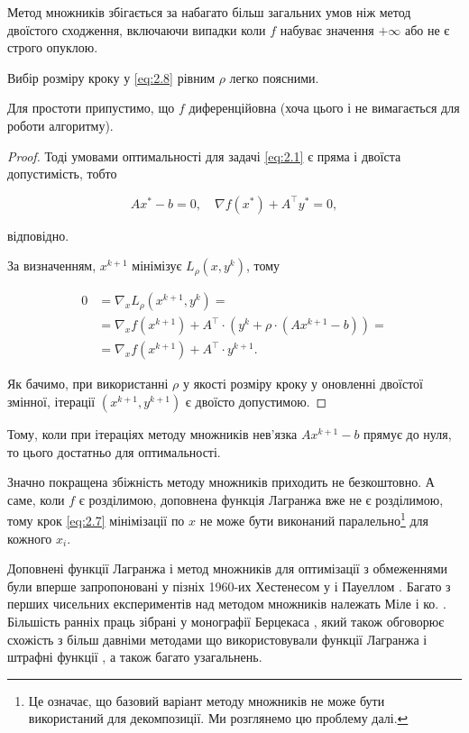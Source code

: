 \begin{remark}
    Метод множників збігається за набагато більш загальних умов ніж метод двоїстого сходження, включаючи випадки коли $f$ набуває значення $+\infty$ або не є строго опуклою.
\end{remark}

\begin{proposition}
    Вибір розміру кроку у \eqref{eq:2.8} рівним $\rho$ легко поясними.
\end{proposition}

\begin{assumption}
    Для простоти припустимо, що $f$ диференційовна (хоча цього і не вимагається для роботи алгоритму). 
\end{assumption}

\begin{proof}
    Тоді умовами оптимальності для задачі \eqref{eq:2.1} є пряма і двоїста допустимість, тобто
    
    \begin{equation}
    	A x^* - b = 0, \quad \nabla f(x^*) + A^\intercal y^* = 0,
    \end{equation}
    
    відповідно. \medskip
    
    За визначенням, $x^{k + 1}$ мінімізує $L_\rho(x, y^k)$, тому
    
    \begin{align}
    	0 &= \nabla_x L_\rho \left(x^{k + 1}, y^k\right) = \\
    	  &= \nabla_x f \left(x^{k + 1}\right) + 
    	  A^\intercal \cdot \left(y^k + \rho \cdot \left(A x^{k + 1} - b\right)\right) = \\
    	  &= \nabla_x f \left(x^{k + 1}\right) + A^\intercal \cdot y^{k + 1}.
    \end{align}
    
    Як бачимо, при використанні $\rho$ у якості розміру кроку у оновленні двоїстої змінної, ітерації $\left( x^{k + 1}, y^{k + 1} \right)$ є двоїсто допустимою.
\end{proof}

Тому, коли при ітераціях методу множників нев'язка $A x^{k + 1} - b$ прямує до нуля, то цього достатньо для оптимальності. \medskip

Значно покращена збіжність методу множників приходить не безкоштовно. А саме, коли $f$ є розділимою, доповнена функція Лагранжа вже не є розділимою, тому крок \eqref{eq:2.7} мінімізації по $x$ не може бути виконаний паралельно\footnote{Це означає, що базовий варіант методу множників не може бути використаний для декомпозиції. Ми розглянемо цю проблему далі.} для кожного $x_i$.  \medskip

Доповнені функції Лагранжа і метод множників для оптимізації з обмеженнями були вперше запропоновані у пізніх 1960-их Хестенесом у \cite{97, 98} і Пауеллом \cite{138}. Багато з перших чисельних експериментів над методом множників належать Міле і ко. \cite{124, 125, 126}. Більшість ранніх праць зібрані у монографії Берцекаса \cite{15}, який також обговорює схожість з більш давніми методами що використовували функції Лагранжа і штрафні функції \cite{6, 5, 71}, а також багато узагальнень.